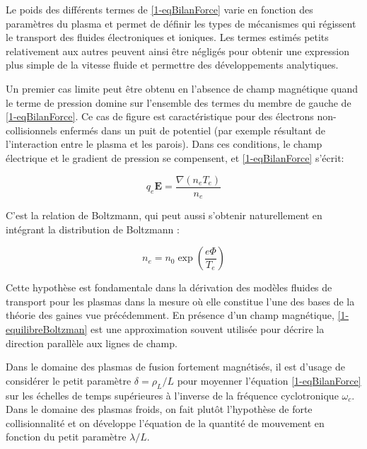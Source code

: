 \begin{refsection}
Le poids des différents termes de \eqref{1-eqBilanForce} varie en fonction des
paramètres du plasma et permet de définir les types de mécanismes qui régissent
le transport des fluides électroniques et ioniques. Les termes estimés petits
relativement aux autres peuvent ainsi être négligés pour obtenir une
expression plus simple de la vitesse fluide et permettre des développements
analytiques.

Un premier cas limite peut être obtenu en l'absence de champ magnétique quand
le terme de pression domine sur l'ensemble des termes du membre de gauche de
\eqref{1-eqBilanForce}. Ce cas de figure est caractéristique pour des électrons
non-collisionnels enfermés dans un puit de potentiel (par exemple résultant de
l'interaction entre le plasma et les parois). Dans ces conditions, le champ électrique et le gradient
de pression se compensent, et \eqref{1-eqBilanForce} s'écrit:

\begin{equation}
\label{1-equilibreBoltzman}
q_e\mathbf
E =\frac{\nabla (n_e T_e)}{n_e}
\end{equation}

C'est la relation de Boltzmann, qui peut aussi s'obtenir naturellement en
intégrant la distribution de Boltzmann :

\begin{equation}
\label{1-profilBoltzman}
n_e=n_0\exp\left(\frac{e\Phi}{T_e}\right)
\end{equation}

Cette hypothèse est fondamentale dans la dérivation des modèles fluides
de transport pour les plasmas dans la mesure où elle constitue l'une des bases
de la théorie des gaines vue précédemment.
En présence d'un champ magnétique,
\eqref{1-equilibreBoltzman} est une approximation souvent utilisée pour
décrire la direction parallèle aux lignes de champ. 

Dans le domaine des plasmas de fusion fortement magnétisés, il est
d'usage de considérer le petit paramètre $\delta=\rho_L/L$ pour moyenner
l'équation \eqref{1-eqBilanForce} sur les échelles de temps supérieures à
l'inverse de la fréquence cyclotronique $\omega_{c}$.
Dans le domaine des plasmas
froids, on fait plutôt l'hypothèse de forte collisionnalité et on développe
l'équation de la quantité de mouvement en fonction du petit paramètre
$\lambda/L$.


\end{refsection}
